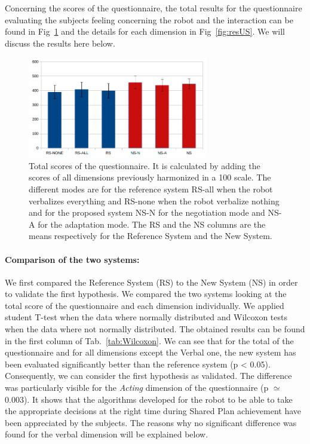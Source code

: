 \documentclass[english,a4paper,11pt,twoside]{StyleThese}
\begin{document}
Concerning the scores of the questionnaire, the total results for the questionnaire evaluating the subjects feeling concerning the robot and the interaction can be found in Fig~\ref{fig:resUSTotal} and the details for each dimension in Fig~\ref{fig:resUS}. We will discuss the results here below.

\begin{figure}[!h]
	\centering
    \includegraphics[width=0.7\textwidth]{figs/Chapter5/Total.png}
    \caption{Total scores of the questionnaire. It is calculated by adding the scores of all dimensions previously harmonized in a 100 scale. The different modes are for the reference system RS-all when the robot verbalizes everything and RS-none when the robot verbalize nothing and for the proposed system NS-N for the negotiation mode and NS-A for the adaptation mode. The RS and the NS columns are the means respectively for the Reference System and the New System.}
    \label{fig:resUSTotal}
\end{figure}

\paragraph{Comparison of the two systems:} We first compared the Reference System (RS) to the New System (NS) in order to validate the first hypothesis. We compared the two systems looking at the total score of the questionnaire and each dimension individually. We applied student T-test when the data where normally distributed and Wilcoxon tests when the data where not normally distributed. The obtained results can be found in the first column of Tab.~\ref{tab:Wilcoxon}. We can see that for the total of the questionnaire and for all dimensions except the Verbal one, the new system has been evaluated significantly better than the reference system (p < 0.05). Consequently, we can consider the first hypothesis as validated. The difference was particularly visible for the \textit{Acting} dimension of the questionnaire (p $\simeq$ 0.003). It shows that the algorithms developed for the robot to be able to take the appropriate decisions at the right time during Shared Plan achievement have been appreciated by the subjects. The reasons why no significant difference was found for the verbal dimension will be explained below. 
\end{document}
